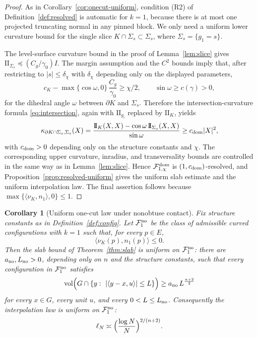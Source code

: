 \documentclass[11pt]{article}
\newtheorem{corollary}[theorem]{Corollary}
\newcommand{\vol}{\operatorname{vol}}
\begin{document}
\begin{proof}
As in Corollary~\ref{cor:onecut-uniform}, condition (R2) of
Definition~\ref{def:resolved} is automatic for \(k=1\), because there is at
most one projected truncating normal in any pinned block.  We only need a
uniform lower curvature bound for the single slice \(K\cap\Sigma_s\subset
\Sigma_s\), where \(\Sigma_s=\{g_1=s\}\).

The level-surface curvature bound in the proof of Lemma~\ref{lem:slice} gives
\(\mathrm{I\!I}_{\Sigma_s}\preceq (C_g/\gamma_0)I\).  The margin assumption and
the \(C^2\) bounds imply that, after restricting to \(|s|\le\delta_\chi\) with
\(\delta_\chi\) depending only on the displayed parameters,
\[
  c_K-\max\{\cos\omega,0\}\,\frac{C_g}{\gamma_0}\ge\chi/2,
  \qquad \sin\omega\ge c(\gamma)>0,
\]
for the dihedral angle \(\omega\) between \(\partial K\) and \(\Sigma_s\).
Therefore the intersection-curvature formula \eqref{eq:intersection}, again
with \(\mathrm{I\!I}_{g_i}\) replaced by \(\mathrm{I\!I}_K\), yields
\[
  \kappa_{\partial K\cap\Sigma_s,\Sigma_s}(X)
  =
  \frac{\mathrm{I\!I}_K(X,X)-\cos\omega\,\mathrm{I\!I}_{\Sigma_s}(X,X)}
       {\sin\omega}
  \ge c_{\rm dom}|X|^2,
\]
with \(c_{\rm dom}>0\) depending only on the structure constants and \(\chi\).
The corresponding upper curvature, inradius, and transversality bounds are
controlled in the same way as in Lemma~\ref{lem:slice}.  Hence
\(\mathcal F^{\rm dom}_{1,\chi}\) is \((1,c_{\rm dom})\)-resolved, and
Proposition~\ref{prop:resolved-uniform} gives the uniform slab estimate and the
uniform interpolation law.  The final assertion follows because
\(\max\{\langle\nu_K,n_1\rangle,0\}\le1\).
\end{proof}

\begin{corollary}[Uniform one-cut law under nonobtuse contact]
\label{cor:onecut-nonobtuse}
Fix structure constants as in Definition~\ref{def:config}.  Let
\(\mathcal F^{\rm no}_{1}\) be the class of admissible curved configurations
with \(k=1\) such that, for every \(p\in E\),
\[
  \langle\nu_K(p),n_1(p)\rangle\le0 .
\]
Then the slab bound of Theorem~\ref{thm:slab} is uniform on
\(\mathcal F^{\rm no}_{1}\): there are \(a_{\rm no},L_{\rm no}>0\), depending
only on \(n\) and the structure constants, such that every configuration in
\(\mathcal F^{\rm no}_{1}\) satisfies
\[
\vol\Bigl(G\cap\{y:\ |\langle y-x,u\rangle|\le L\}\Bigr)
\ge a_{\rm no}\,L^{\frac{n+2}2}
\]
for every \(x\in G\), every unit \(u\), and every \(0<L\le L_{\rm no}\).
Consequently the interpolation law is uniform on \(\mathcal F^{\rm no}_{1}\):
\[
  \ell_N\asymp\Bigl(\frac{\log N}{N}\Bigr)^{2/(n+2)} .
\]
\end{corollary}
\end{document}
